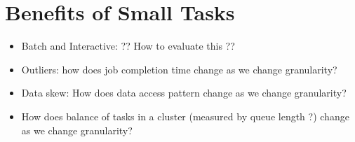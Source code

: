 \section{Benefits of Small Tasks}
\begin{itemize}
\item Batch and Interactive: ?? How to evaluate this ??
\item Outliers: how does job completion time change as we change granularity? 
\item Data skew: How does data access pattern change as we change granularity? 
\item How does balance of tasks in a cluster (measured by queue length ?) change as we change granularity? 
\end{itemize}

